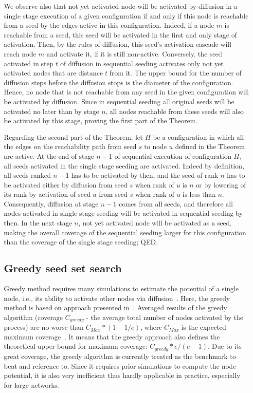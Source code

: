 \documentclass[11pt]{article} %
\begin{document}
We observe also that not yet activated node will be activated by diffusion in a single stage execution of a given configuration if and only if this node is reachable from a seed by the edges active in this configuration. Indeed, if a node $m$ is reachable from a seed, this seed will be activated in the first and only stage of activation. Then, by the rules of diffusion, this seed's activation cascade will reach node $m$ and activate it, if it is still non-active. Conversely, the seed activated in step $t$ of diffusion in sequential seeding activates only not yet activated nodes that are distance $t$ from it. The upper bound for the number of diffusion steps before the diffusion stops is the diameter of the configuration. Hence, no node that is not reachable from any seed in the given configuration will be activated by diffusion. Since in sequential seeding all original seeds will be activated no later than by stage $n$, all nodes reachable from these seeds will also be activated by this stage, proving the first part of the Theorem.

Regarding the second part of the Theorem, let $H$ be a configuration in which all the edges on the reachability path from seed $s$ to node $u$ defined in the Theorem are active. At the end of stage $n-1$ of sequential execution of configuration $H$, all seeds activated in the single stage seeding are activated. Indeed by definition, all seeds ranked $n-1$ has to be activated by then, and the seed of rank $n$ has to be activated either by diffusion from seed $s$ when rank of $u$ is $n$ or by lowering of its rank by activation of seed $u$ from seed $s$ when rank of $u$ is less than $n$. Consequently, diffusion at stage $n-1$ comes from all seeds, and therefore all nodes activated in single stage seeding will be activated in sequential seeding by then. In the next stage $n$, not yet activated node will be activated as a seed, making the overall coverage of the sequential seeding larger for this configuration than the coverage of the single stage seeding; QED.

\subsection*{Greedy seed set search}
Greedy method requires many simulations to estimate the potential of a single node, i.e., its ability to activate other nodes via diffusion~\cite{Kempe:2003, kempe2015}. Here, the greedy method is based on approach presented in~\cite{kempe2015}. Averaged results of the greedy algorithm (coverage $C_{greedy}$ - the average total number of nodes activated by the process) are no worse than $C_{Max} * (1 - 1/e)$, where $C_{Max}$ is the expected maximum coverage~\cite{kempe2015}. It means that the greedy approach also defines the theoretical upper bound for maximum coverage: $C_{greedy} * e/(e-1)$. Due to its great coverage, the greedy algorithm is currently treated as the benchmark to beat and reference to. Since it requires prior simulations to compute the node potential, it is also very inefficient thus hardly applicable in practice, especially for large networks.
\end{document}
